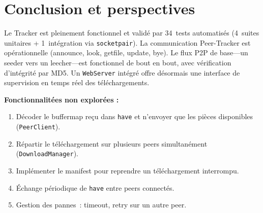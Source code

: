 \documentclass[11pt, a4paper]{article}
\begin{document}
\section{Conclusion et perspectives}
 
Le Tracker est pleinement fonctionnel et validé par 34~tests automatisés
(4~suites unitaires + 1~intégration via \texttt{socketpair}).
La communication Peer-Tracker est opérationnelle (announce, look, getfile,
update, bye). Le flux P2P de base---un seeder vers un leecher---est
fonctionnel de bout en bout, avec vérification d'intégrité par MD5.
Un \texttt{WebServer} intégré offre désormais une interface de supervision
en temps réel des téléchargements.
 
\textbf{Fonctionnalitées non explorées :}
\begin{enumerate}[nosep]
    \item Décoder le buffermap reçu dans \texttt{have} et n'envoyer
          que les pièces disponibles (\texttt{PeerClient}).
    \item Répartir le téléchargement sur plusieurs peers simultanément
          (\texttt{DownloadManager}).
    \item Implémenter le manifest pour reprendre un téléchargement
          interrompu.
    \item Échange périodique de \texttt{have} entre peers connectés.
    \item Gestion des pannes~: timeout, retry sur un autre peer.
\end{enumerate}
 
\end{document}
